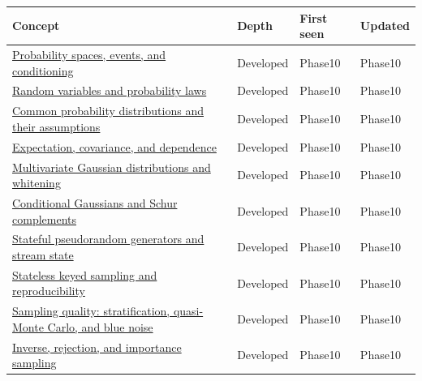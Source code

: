 {\def\LTcaptype{none} %
\begin{longtable}[]{@{}
  >{\raggedright\arraybackslash}p{}
  >{\raggedright\arraybackslash}p{}
  >{\raggedright\arraybackslash}p{}
  >{\raggedright\arraybackslash}p{}@{}}
\toprule\noalign{}
\begin{minipage}[b]{\linewidth}\raggedright
Concept
\end{minipage} & \begin{minipage}[b]{\linewidth}\raggedright
Depth
\end{minipage} & \begin{minipage}[b]{\linewidth}\raggedright
First seen
\end{minipage} & \begin{minipage}[b]{\linewidth}\raggedright
Updated
\end{minipage} \\
\midrule\noalign{}
\endhead
\bottomrule\noalign{}
\endlastfoot
\hyperref[appendix-f1ef323f6ed7]{Probability spaces, events, and conditioning} & Developed & Phase10 & Phase10 \\
\hyperref[appendix-4d0203f7944f]{Random variables and probability laws} & Developed & Phase10 & Phase10 \\
\hyperref[appendix-a2360b435383]{Common probability distributions and their assumptions} & Developed & Phase10 & Phase10 \\
\hyperref[appendix-54c383df9992]{Expectation, covariance, and dependence} & Developed & Phase10 & Phase10 \\
\hyperref[appendix-12bbe185dbe5]{Multivariate Gaussian distributions and whitening} & Developed & Phase10 & Phase10 \\
\hyperref[appendix-f0437ea55a47]{Conditional Gaussians and Schur complements} & Developed & Phase10 & Phase10 \\
\hyperref[appendix-e0f7c7e08f3a]{Stateful pseudorandom generators and stream state} & Developed & Phase10 & Phase10 \\
\hyperref[appendix-daaf25bfd3a0]{Stateless keyed sampling and reproducibility} & Developed & Phase10 & Phase10 \\
\hyperref[appendix-9f693ffd82bc]{Sampling quality: stratification, quasi-Monte Carlo, and blue noise} & Developed & Phase10 & Phase10 \\
\hyperref[appendix-8d863ed954d0]{Inverse, rejection, and importance sampling} & Developed & Phase10 & Phase10 \\

\end{longtable}}
